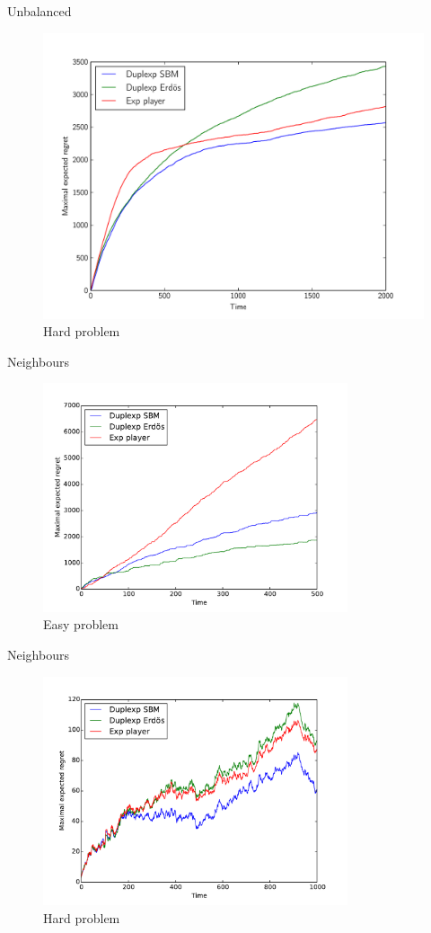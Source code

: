 \documentclass[11pt]{beamer}
\begin{document}
\begin{frame}{Unbalanced}
\begin{figure}[ht]
	\centering
	\includegraphics[width=.8\textwidth]{hard}
	\caption{Hard problem}
\end{figure}
\end{frame}

\begin{frame}{Neighbours}
\begin{figure}[ht]
	\centering
	\includegraphics[width=0.8\textwidth]{regret_balanced_easy}
	\caption{Easy problem}
	\label{fig:easy}
\end{figure}
\end{frame}

\begin{frame}{Neighbours}
\begin{figure}[ht]
	\centering
	\includegraphics[width=0.8\textwidth]{regret_balanced_hard}
	\caption{Hard problem}
	\label{fig:easy}
\end{figure}
\end{frame}
\end{document}
